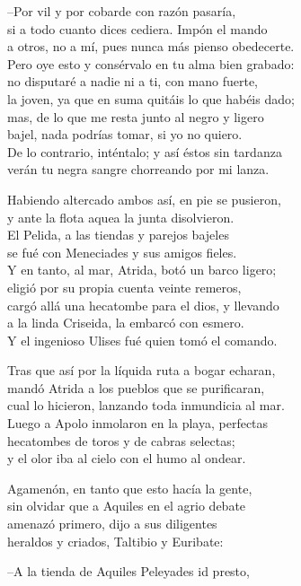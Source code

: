 \documentclass[11pt,twoside]{article}
\begin{document}
--Por vil y por cobarde con razón pasaría,\\
si a todo cuanto dices cediera. Impón el mando\\
a otros, no a mí, pues nunca más pienso obedecerte.\\
Pero oye esto y consérvalo en tu alma bien grabado:\\
no disputaré a nadie ni a ti, con mano fuerte,\\
la joven, ya que en suma quitáis lo que habéis dado;\\
mas, de lo que me resta junto al negro y ligero\\
bajel, nada podrías tomar, si yo no quiero.\\
De lo contrario, inténtalo; y así éstos sin tardanza\\
verán tu negra sangre chorreando por mi lanza.\par
Habiendo altercado ambos así, en pie se pusieron,\\
y ante la flota aquea la junta disolvieron.\\
El Pelida, a las tiendas y parejos bajeles\\
se fué con Meneciades y sus amigos fieles.\\
Y en tanto, al mar, Atrida, botó un barco ligero;\\
eligió por su propia cuenta veinte remeros,\\
cargó allá una hecatombe para el dios, y llevando\\
a la linda Criseida, la embarcó con esmero.\\
Y el ingenioso Ulises fué quien tomó el comando.\par
Tras que así por la líquida ruta a bogar echaran,\\
mandó Atrida a los pueblos que se purificaran,\\
cual lo hicieron, lanzando toda inmundicia al mar.\\
Luego a Apolo inmolaron en la playa, perfectas\\
hecatombes de toros y de cabras selectas;\\
y el olor iba al cielo con el humo al ondear.\par
Agamenón, en tanto que esto hacía la gente,\\
sin olvidar que a Aquiles en el agrio debate\\
amenazó primero, dijo a sus diligentes\\
heraldos y criados, Taltibio y Euribate:\par
--A la tienda de Aquiles Peleyades id presto,\\
\end{document}
